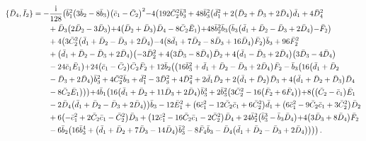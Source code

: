 \documentclass[10pt]{amsart}
\theoremstyle{definition}
\theoremstyle{corollary}
\theoremstyle{remark}
\theoremstyle{conclusion}
\begin{document}
\begin{align}
\{\bar{D}_4, \bar{I}_2\}&=-\frac{{\rm i}}{128}  \bigl(\bar{b}_1^2 \bigl(3 \bar{b}_2-8 \bar{b}_3\bigl) \bigl(\bar{c}_1-\bar{C}_2\bigl)^2-4 \bigl(192 \bar{C}_2^2 \bar{b}_3^3+48\bar{b}_3^2 \bigl(\bar{d}_1^2+2 \bigl(\bar{D}_2+\bar{D}_3+2 \bar{D}_4\bigl) \bar{d}_1+4 \bar{D}_4^2  \nonumber \\
& \hskip 0.7 cm	+\bar{D}_3 \bigl(2 \bar{D}_2-3 \bar{D}_3\bigl)+4 \bigl(\bar{D}_2+\bar{D}_3\bigl) \bar{D}_4-8 \bar{C}_2 \bar{E}_1\bigl) +48 \bar{b}_2^2\bar{b}_3 \bigl(\bar{b}_3 \bigl(\bar{d}_1+\bar{D}_2-\bar{D}_3+2 \bar{D}_4\bigl)-\bar{F}_2\bigl)  \nonumber \\
& \hskip 0.7 cm +4 \bigl(3 \bar{C}_2^2 \bigl(\bar{d}_1+\bar{D}_2-\bar{D}_3+2 \bar{D}_4\bigl)-4 \bigl(8 \bar{d}_1+7 \bar{D}_2-8 \bar{D}_3+16 \bar{D}_4\bigl) \bar{F}_2\bigl) \bar{b}_3+96 \bar{F}_2^2  \nonumber \\
& \hskip 0.7 cm+\bigl(\bar{d}_1+\bar{D}_2-\bar{D}_3+2 \bar{D}_4\bigl) \bigl(-3 \bar{D}_2^2+4 \bigl(3 \bar{D}_3-8 \bar{D}_4\bigl) \bar{D}_2+4 \bigl(\bar{d}_1-\bar{D}_3+2 \bar{D}_4\bigl) \bigl(3 \bar{D}_3-4 \bar{D}_4\bigl) \nonumber \\
& \hskip 0.7 cm-24 \bar{c}_1 \bar{E}_1\bigl)+24 \bigl(\bar{c}_1-\bar{C}_2\bigl) \bar{C}_2 \bar{F}_2+12 \bar{b}_2 \bigl(\bigl(16 \bar{b}_3^2+\bar{d}_1+\bar{D}_2-\bar{D}_3+2 \bar{D}_4\bigl) \bar{F}_2-\bar{b}_3 \bigl(16 \bigl(\bar{d}_1+\bar{D}_2 \nonumber \\
& \hskip 0.7 cm-\bar{D}_3+2 \bar{D}_4\bigl) \bar{b}_3^2+4 \bar{C}_2^2 \bar{b}_3+\bar{d}_1^2-3 \bar{D}_3^2+4 \bar{D}_4^2+2 \bar{d}_1 \bar{D}_2+2 \bigl(\bar{d}_1+\bar{D}_2\bigl) \bar{D}_3+4 \bigl(\bar{d}_1+\bar{D}_2+\bar{D}_3\bigl) \bar{D}_4 \nonumber \\
& \hskip 0.7 cm-8 \bar{C}_2 \bar{E}_1\bigl)\bigl)\bigl)+4 \bar{b}_1 \bigl(16 \bigl(\bar{d}_1+\bar{D}_2+11 \bar{D}_3+2 \bar{D}_4\bigl) \bar{b}_3^3+2 \bar{b}_3^2\bigl(3 \bar{C}_2^2-16 \bigl(\bar{F}_2+6 \bar{F}_4\bigl)\bigl) +8 \bigl(\bigl(\bar{C}_2-\bar{c}_1\bigl) \bar{E}_1  \nonumber \\
& \hskip 0.7 cm-2 \bar{D}_4 \bigl(\bar{d}_1+\bar{D}_2-\bar{D}_3+2 \bar{D}_4\bigl)\bigl) \bar{b}_3-12 \bar{E}_1^2+\bigl(6 \bar{c}_1^2-12 \bar{C}_2 \bar{c}_1+6 \bar{C}_2^2\bigl) \bar{d}_1+\bigl(6 \bar{c}_1^2-9 \bar{C}_2 \bar{c}_1+3 \bar{C}_2^2\bigl) \bar{D}_2  \nonumber \\
& \hskip 0.7 cm+6 \bigl(-\bar{c}_1^2+2 \bar{C}_2 \bar{c}_1-\bar{C}_2^2\bigl) \bar{D}_3+\bigl(12 \bar{c}_1^2-16 \bar{C}_2 \bar{c}_1-2 \bar{C}_2^2\bigl) \bar{D}_4+24 \bar{b}_2^2 \bigl(\bar{b}_3^3-\bar{b}_3 \bar{D}_4\bigl)+4 \bigl(3 \bar{D}_3+8 \bar{D}_4\bigl) \bar{F}_2 \nonumber \\
& \hskip 0.7 cm-6 \bar{b}_2 \bigl(16 \bar{b}_3^4+\bigl(\bar{d}_1+\bar{D}_2+7 \bar{D}_3-14 \bar{D}_4\bigl) \bar{b}_3^2-8 \bar{F}_4 \bar{b}_3-\bar{D}_4 \bigl(\bar{d}_1+\bar{D}_2-\bar{D}_3+2 \bar{D}_4\bigl)\bigl)\bigl)\bigl) \, .
\end{align} 
\end{document}
